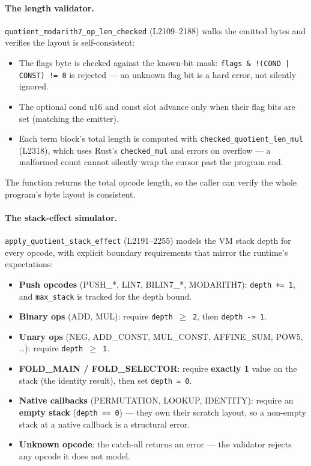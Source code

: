 \paragraph{The length validator.}
\texttt{quotient\_\allowbreak{}modarith7\_\allowbreak{}op\_\allowbreak{}len\_\allowbreak{}checked} (L2109--2188)
walks the emitted bytes and verifies the layout is self-consistent:
\begin{itemize}[leftmargin=1.4em,itemsep=2pt]
\item The flags byte is checked against the known-bit mask:
  \texttt{flags \& !(COND | CONST) != 0} is rejected --- an
  unknown flag bit is a hard error, not silently ignored.
\item The optional cond u16 and const slot advance only when
  their flag bits are set (matching the emitter).
\item Each term block's total length is computed with
  \texttt{checked\_\allowbreak{}quotient\_\allowbreak{}len\_\allowbreak{}mul} (L2318), which uses
  Rust's \texttt{checked\_mul} and errors on overflow --- a
  malformed count cannot silently wrap the cursor past the program
  end.
\end{itemize}
The function returns the total opcode length, so the caller can
verify the whole program's byte layout is consistent.

\paragraph{The stack-effect simulator.}
\texttt{apply\_\allowbreak{}quotient\_\allowbreak{}stack\_\allowbreak{}effect} (L2191--2255) models the
VM stack depth for every opcode, with explicit boundary
requirements that mirror the runtime's expectations:
\begin{itemize}[leftmargin=1.4em,itemsep=2pt]
\item \textbf{Push opcodes} (PUSH\_*, LIN7, BILIN7\_*,
  MODARITH7): \texttt{depth += 1}, and \texttt{max\_stack} is
  tracked for the depth bound.
\item \textbf{Binary ops} (ADD, MUL): require
  \texttt{depth $\ge$ 2}, then \texttt{depth -= 1}.
\item \textbf{Unary ops} (NEG, ADD\_CONST, MUL\_CONST,
  AFFINE\_SUM, POW5, \ldots): require \texttt{depth $\ge$ 1}.
\item \textbf{FOLD\_MAIN / FOLD\_SELECTOR}: require
  \textbf{exactly 1} value on the stack (the identity result),
  then set \texttt{depth = 0}.
\item \textbf{Native callbacks} (PERMUTATION, LOOKUP, IDENTITY):
  require an \textbf{empty stack} (\texttt{depth == 0}) --- they
  own their scratch layout, so a non-empty stack at a native
  callback is a structural error.
\item \textbf{Unknown opcode}: the catch-all returns an error
  --- the validator rejects any opcode it does not model.
\end{itemize}

